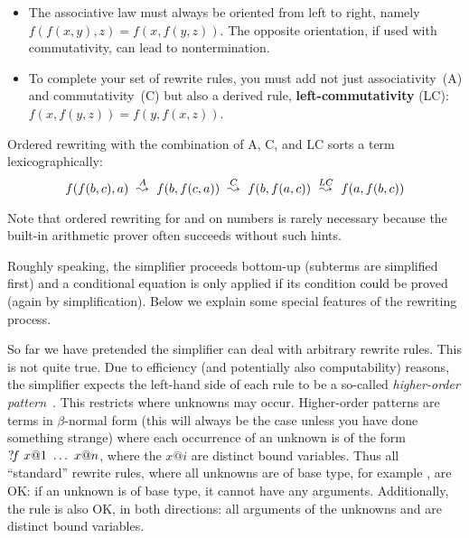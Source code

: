 \begin{isabellebody}
\begin{isamarkuptext}
\begin{itemize}
\item The associative law must always be oriented from left to right,
  namely $f(f(x,y),z) = f(x,f(y,z))$.  The opposite orientation, if
  used with commutativity, can lead to nontermination.

\item To complete your set of rewrite rules, you must add not just
  associativity~(A) and commutativity~(C) but also a derived rule, {\bf
    left-com\-mut\-ativ\-ity} (LC): $f(x,f(y,z)) = f(y,f(x,z))$.
\end{itemize}
Ordered rewriting with the combination of A, C, and LC sorts a term
lexicographically:
\[\def\maps#1{~\stackrel{#1}{\leadsto}~}
 f(f(b,c),a) \maps{A} f(b,f(c,a)) \maps{C} f(b,f(a,c)) \maps{LC} f(a,f(b,c)) \]

Note that ordered rewriting for \isa{{\isacharplus}} and \isa{{\isacharasterisk}} on numbers is rarely
necessary because the built-in arithmetic prover often succeeds without
such hints.%
\end{isamarkuptext}%
%
%
\begin{isamarkuptext}%
\label{sec:SimpHow}
Roughly speaking, the simplifier proceeds bottom-up (subterms are simplified
first) and a conditional equation is only applied if its condition could be
proved (again by simplification). Below we explain some special features of the rewriting process.%
\end{isamarkuptext}%
%
%
\begin{isamarkuptext}%
So far we have pretended the simplifier can deal with arbitrary
rewrite rules. This is not quite true.  Due to efficiency (and
potentially also computability) reasons, the simplifier expects the
left-hand side of each rule to be a so-called \emph{higher-order
pattern}~\cite{nipkow-patterns}. This restricts where
unknowns may occur.  Higher-order patterns are terms in $\beta$-normal
form (this will always be the case unless you have done something
strange) where each occurrence of an unknown is of the form
${?\!f}~x@1~\dots~x@n$, where the $x@i$ are distinct bound
variables. Thus all ``standard'' rewrite rules, where all unknowns are
of base type, for example , are OK: if an unknown is
of base type, it cannot have any arguments. Additionally, the rule
 is also OK, in
both directions: all arguments of the unknowns  and
 are distinct bound variables.


\end{isamarkuptext}
\end{isabellebody}
